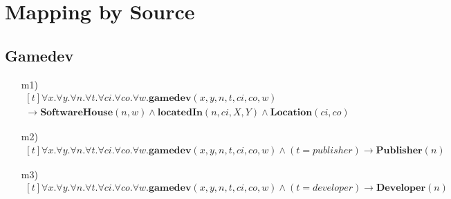 \section*{Mapping by Source}

\subsection*{Gamedev}
\begin{itemize}
	\item[m1)] 
	$ \begin{aligned}[t]
	\forall x. \forall y. \forall n. \forall t. \forall ci. \forall co. \forall w.\textbf{gamedev}(x, y, n, t, ci, co, w) \hspace{120pt} \\
	\rightarrow \textbf{SoftwareHouse}(n,w) \wedge \textbf{locatedIn}(n,ci, X, Y) \wedge \textbf{Location}(ci,co)
	\end{aligned} $
	\item[m2)]
	$ \begin{aligned}[t]
	\forall x. \forall y. \forall n. \forall t. \forall ci. \forall co. \forall w.\textbf{gamedev}(x, y, n, t, ci, co, w) \wedge (t=publisher) \rightarrow \textbf{Publisher}(n)
	\end{aligned} $
	\item[m3)]
	$ \begin{aligned}[t]
	\forall x. \forall y. \forall n. \forall t. \forall ci. \forall co. \forall w.\textbf{gamedev}(x, y, n, t, ci, co, w) \wedge (t=developer) \rightarrow \textbf{Developer}(n)
	\end{aligned} $
\end{itemize}

